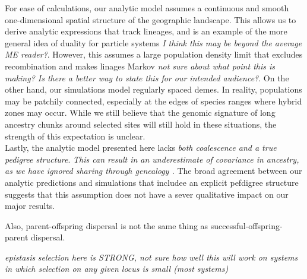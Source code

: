 \documentclass[12pt]{article}
\newcommand{\alisa}[1]{{\em \color{red} #1}}
\newcommand{\yb}[1]{{\em \color{magenta} #1}}
\begin{document}
For ease of calculations, our analytic model assumes a continuous and smooth one-dimensional spatial structure of the geographic landscape. This allows us to derive analytic expressions that track lineages, and is an example of the more general idea of duality for particle systems \alisa{I think this may be beyond the average ME reader?}. However, this assumes a large population density limit that excludes recombination and makes linages Markov \alisa{not sure about what point this is making? Is there a better way to state this for our intended audience?}.  On the other hand, our simulations model regularly spaced demes. In reality, populations may be patchily connected, especially at the edges of species ranges where hybrid zones may occur. While we still believe that the genomic signature of long ancestry chunks around selected sites will still hold in these situations, the strength of this expectation is unclear.\\

Lastly, the analytic model presented here lacks \yb{both coalescence and a true pedigree structure}. \alisa{This can result in an underestimate of covariance in ancestry, as we have ignored sharing through genealogy \cite{Liang2014}.} 
The broad agreement between our analytic predictions and simulations that includee an explicit pefdigree structure suggests that this assumption does not have a sever qualitative impact on our major results. 



Also, parent-offspring dispersal is not the same thing as successful-offspring-parent dispersal.


\alisa{epistasis}
\alisa{selection here is STRONG, not sure how well this will work on systems in which selection on any given locus is small (most systems)}
\end{document}
